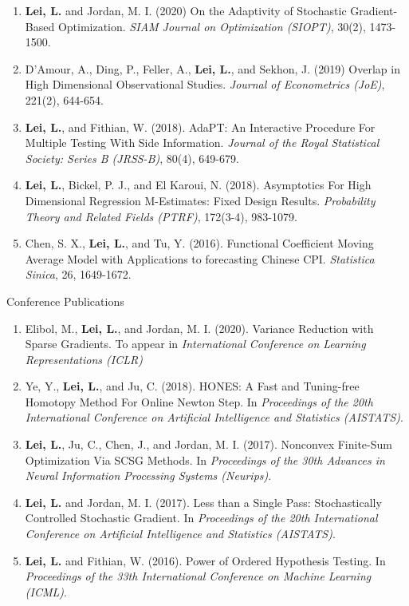 \documentclass{article}
\begin{document}
\begin{enumerate}
\item \textbf{Lei, L.} and Jordan, M. I. (2020) On the Adaptivity of Stochastic Gradient-Based Optimization. \emph{SIAM Journal on Optimization (SIOPT)}, 30(2), 1473-1500.
\item D'Amour, A., Ding, P., Feller, A., \textbf{Lei, L.}, and Sekhon, J. (2019) Overlap in High Dimensional Observational Studies. \emph{Journal of Econometrics (JoE)}, 221(2), 644-654.
\item \textbf{Lei, L.}, and Fithian, W. (2018). AdaPT: An Interactive Procedure For Multiple Testing With Side Information. \emph{Journal of the Royal Statistical Society: Series B (JRSS-B)}, 80(4), 649-679.
\item \textbf{Lei, L.}, Bickel, P. J., and El Karoui, N. (2018). Asymptotics For High Dimensional Regression M-Estimates: Fixed Design Results. \emph{Probability Theory and Related Fields (PTRF)}, 172(3-4), 983-1079.
\item Chen, S. X., \textbf{Lei, L.}, and Tu, Y. (2016). Functional Coefficient Moving Average Model with Applications to forecasting Chinese CPI. \emph{Statistica Sinica}, 26, 1649-1672.
\end{enumerate}

\begin{large}
\noindent Conference Publications
\end{large}

\begin{enumerate}
\item Elibol, M., \textbf{Lei, L.}, and Jordan, M. I. (2020). Variance Reduction with Sparse Gradients. To appear in \emph{International Conference on Learning Representations (ICLR)}
\item Ye, Y., \textbf{Lei, L.}, and Ju, C. (2018). HONES: A Fast and Tuning-free Homotopy Method For Online Newton Step. In \emph{Proceedings of the 20th International Conference on Artificial Intelligence and Statistics (AISTATS)}.
\item \textbf{Lei, L.}, Ju, C., Chen, J., and Jordan, M. I. (2017). Nonconvex Finite-Sum Optimization Via SCSG Methods. In \emph{Proceedings of the 30th Advances in Neural Information Processing Systems (Neurips)}.
\item \textbf{Lei, L.} and Jordan, M. I. (2017). Less than a Single Pass: Stochastically Controlled Stochastic Gradient. In \emph{Proceedings of the 20th International Conference on Artificial Intelligence and Statistics (AISTATS)}.
\item \textbf{Lei, L.} and Fithian, W. (2016). Power of Ordered Hypothesis Testing. In \emph{Proceedings of the 33th International Conference on Machine Learning (ICML)}.
\end{enumerate}
\end{document}
